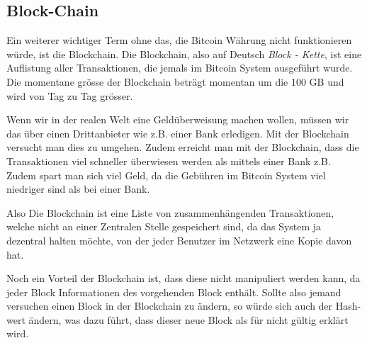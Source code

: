 \subsection*{Block-Chain}

\noindent
Ein weiterer wichtiger Term ohne das, die Bitcoin Währung nicht funktionieren würde, ist die Blockchain.
Die Blockchain, also auf Deutsch \emph{\dq Block - Kette\dq}, ist eine Auflistung aller Transaktionen, die jemals im Bitcoin System ausgeführt wurde.
Die momentane grösse der Blockchain beträgt momentan um die 100 GB und wird von Tag zu Tag grösser.

\noindent
Wenn wir in der realen Welt eine Geldüberweisung machen wollen, müssen wir das über einen Drittanbieter wie z.B. einer Bank erledigen. Mit der Blockchain
versucht man dies zu umgehen. Zudem erreicht man mit der Blockchain, dass die Transaktionen viel schneller überwiesen werden als mittels einer Bank z.B. Zudem
spart man sich viel Geld, da die Gebühren im Bitcoin System viel niedriger sind als bei einer Bank.

\noindent
Also Die Blockchain ist eine Liste von zusammenhängenden Transaktionen, welche nicht an  einer Zentralen Stelle gespeichert sind, da das System ja dezentral halten möchte,
von der jeder Benutzer im Netzwerk eine Kopie davon hat.

\noindent
Noch ein Vorteil der Blockchain ist, dass diese nicht manipuliert werden kann, da jeder Block Informationen des vorgehenden Block enthält. Sollte also jemand versuchen einen Block in der Blockchain
zu ändern, so würde sich auch der Hash-wert ändern, was dazu führt, dass dieser neue Block als für nicht gültig erklärt wird.
